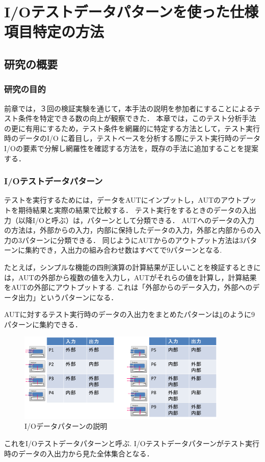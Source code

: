 \documentclass[10pt,a4j]{jarticle}
\begin{document}
\section{I/Oテストデータパターンを使った仕様項目特定の方法}\label{chap:4}
\subsection{研究の概要} \label{sec:4-1}
\subsubsection{研究の目的} \label{sec:4-1-1}
前章では，３回の検証実験を通じて，本手法の説明を参加者にすることによるテスト条件を特定できる数の向上が観察できた．
本章では，このテスト分析手法の更に有用にするため，テスト条件を網羅的に特定する方法として，テスト実行時のデータのI/O に着目し，テストベースを分析する際にテスト実行時のデータI/Oの要素で分解し網羅性を確認する方法を，既存の手法に追加することを提案する．

\subsubsection{I/Oテストデータパターン} \label{sec:4-1-1}
テストを実行するためには，データをAUTにインプットし，AUTのアウトプットを期待結果と実際の結果で比較する．
テスト実行をするときのデータの入出力（以降I/Oと呼ぶ）は，パターンとして分類できる．
AUTへのデータの入力の方法は，外部からの入力，内部に保持したデータの入力，外部と内部からの入力の3パターンに分類できる．
同じようにAUTからのアウトプット方法は3パターンに集約でき，入出力の組み合わせ数はすべてで9パターンとなる.

たとえば，シンプルな機能の四則演算の計算結果が正しいことを検証するときには，AUTの外部から複数の値を入力し，AUTがそれらの値を計算し，計算結果をAUTの外部にアウトプットする.
これは「外部からのデータ入力，外部へのデータ出力」というパターンになる．

AUTに対するテスト実行時のデータの入出力をまとめたパターンは\ref{fig:D-3-Fig11}のように9パターンに集約できる．
   \begin{figure}[htbp]
 \begin{center}
 \includegraphics[width=10cm]{./image/D-3-Fig5.png}
 \caption{I/Oデータパターンの説明}
 \label{fig:D-3-Fig11}
 \end{center}
  \end{figure}
これをI/Oテストデータパターンと呼ぶ.
I/Oテストデータパターンがテスト実行時のデータの入出力から見た全体集合となる．
\end{document}
